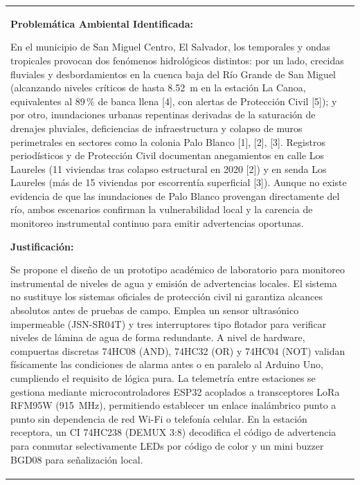 \documentclass[11pt,letterpaper]{article}
\begin{document}
\vspace{0.25em}
\noindent
\begin{tabularx}{\linewidth}{|X|}
  \hline
  \vspace{0.15em}
  \textbf{Problemática Ambiental Identificada:}\par\vspace{0.25em}
  {\fontsize{9.5}{11.8}\selectfont En el municipio de San Miguel Centro, El Salvador, los temporales y ondas tropicales provocan dos fenómenos hidrológicos distintos: por un lado, crecidas fluviales y desbordamientos en la cuenca baja del Río Grande de San Miguel (alcanzando niveles críticos de hasta 8.52~m en la estación La Canoa, equivalentes al 89\,\% de banca llena [4], con alertas de Protección Civil [5]); y por otro, inundaciones urbanas repentinas derivadas de la saturación de drenajes pluviales, deficiencias de infraestructura y colapso de muros perimetrales en sectores como la colonia Palo Blanco [1], [2], [3]. Registros periodísticos y de Protección Civil documentan anegamientos en calle Los Laureles (11 viviendas tras colapso estructural en 2020 [2]) y en senda Los Laureles (más de 15 viviendas por escorrentía superficial [3]). Aunque no existe evidencia de que las inundaciones de Palo Blanco provengan directamente del río, ambos escenarios confirman la vulnerabilidad local y la carencia de monitoreo instrumental continuo para emitir advertencias oportunas.\par}
  \vspace{0.35em}
  \textbf{Justificación:}\par\vspace{0.25em}
  {\fontsize{9.5}{11.8}\selectfont Se propone el diseño de un prototipo académico de laboratorio para monitoreo instrumental de niveles de agua y emisión de advertencias locales. El sistema no sustituye los sistemas oficiales de protección civil ni garantiza alcances absolutos antes de pruebas de campo. Emplea un sensor ultrasónico impermeable (JSN-SR04T) y tres interruptores tipo flotador para verificar niveles de lámina de agua de forma redundante. A nivel de hardware, compuertas discretas 74HC08 (AND), 74HC32 (OR) y 74HC04 (NOT) validan físicamente las condiciones de alarma antes o en paralelo al Arduino Uno, cumpliendo el requisito de lógica pura. La telemetría entre estaciones se gestiona mediante microcontroladores ESP32 acoplados a transceptores LoRa RFM95W (915~MHz), permitiendo establecer un enlace inalámbrico punto a punto sin dependencia de red Wi-Fi o telefonía celular. En la estación receptora, un CI 74HC238 (DEMUX 3:8) decodifica el código de advertencia para conmutar selectivamente LEDs por código de color y un mini buzzer BGD08 para señalización local.\par}

\end{tabularx}
\end{document}
